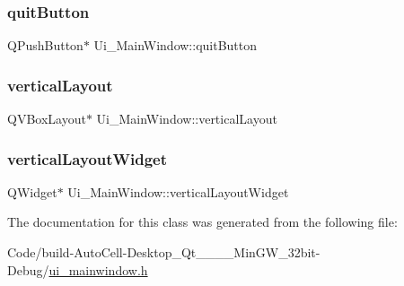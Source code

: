 \subsubsection{\texorpdfstring{quit\+Button}{quitButton}}
{\footnotesize\ttfamily Q\+Push\+Button$\ast$ Ui\+\_\+\+Main\+Window\+::quit\+Button}

\mbox{\label{class_ui___main_window_aecd96a04789fcfec3f98d80390ad8184}} 
\subsubsection{\texorpdfstring{vertical\+Layout}{verticalLayout}}
{\footnotesize\ttfamily Q\+V\+Box\+Layout$\ast$ Ui\+\_\+\+Main\+Window\+::vertical\+Layout}

\mbox{\label{class_ui___main_window_a805d415fff07a22a85219e1f22f2da28}} 
\subsubsection{\texorpdfstring{vertical\+Layout\+Widget}{verticalLayoutWidget}}
{\footnotesize\ttfamily Q\+Widget$\ast$ Ui\+\_\+\+Main\+Window\+::vertical\+Layout\+Widget}



The documentation for this class was generated from the following file\+:\begin{DoxyCompactItemize}
\item 
Code/build-\/\+Auto\+Cell-\/\+Desktop\+\_\+\+Qt\+\_\+\_\+\_\+\_\+\+Min\+G\+W\+\_\+32bit-\/\+Debug/\mbox{\hyperlink{ui__mainwindow_8h}{ui\+\_\+mainwindow.\+h}}\end{DoxyCompactItemize}
